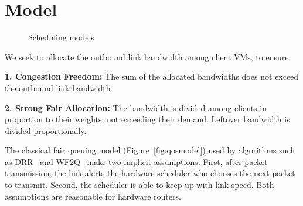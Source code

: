 \section{Model}
\label{sec:model}
\begin{figure}[t]
\center
{}
\vspace{-0.2em}
\caption{Scheduling models}
\label{fig:sched_mod}
\vspace{-0.5em}
\end{figure}
We seek to allocate the outbound link bandwidth among client VMs, to ensure:  

{\bf 1. Congestion Freedom:}  The sum of the allocated bandwidths does not
exceed the outbound link bandwidth.

{\bf 2. Strong Fair Allocation: } The bandwidth is divided among clients in
proportion to their weights, not exceeding their demand. Leftover bandwidth is
divided proportionally.

The classical fair queuing model (Figure~\ref{fig:qosmodel}) used by algorithms such
as DRR~\cite{drr} and WF2Q~\cite{wf2q} make two implicit assumptions. First,
after packet transmission, the link alerts the hardware scheduler who chooses the
next packet to transmit. Second, the scheduler is able to keep up with link
speed.  Both assumptions are reasonable for hardware routers.

